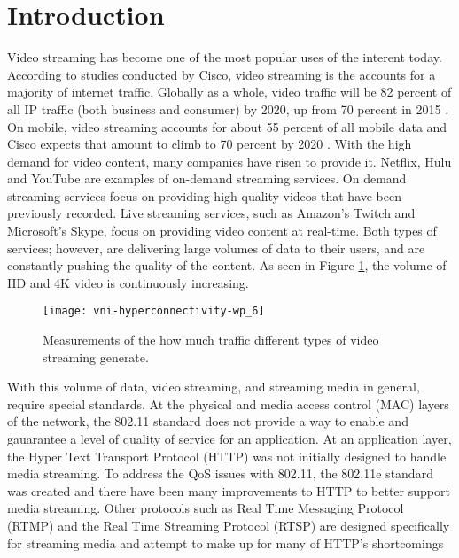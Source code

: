 \documentclass[12pt]{article}
\begin{document}
\section{Introduction}
Video streaming has become one of the most popular uses of the interent today.  According to studies conducted by Cisco, video streaming is the accounts for a majority of internet traffic.  Globally as a whole, video traffic will be 82 percent of all IP traffic (both business and consumer) by 2020, up from 70 percent in 2015 \cite{ciscozetabyte}.  On mobile, video streaming accounts for about 55 percent of all mobile data and Cisco expects that amount to climb to 70 percent by 2020 \cite{cisconetworkindex}.  With the high demand for video content, many companies have risen to provide it.  Netflix, Hulu and YouTube are examples of on-demand streaming services.  On demand streaming services focus on providing high quality videos that have been previously recorded.  Live streaming services, such as Amazon's Twitch and Microsoft's Skype, focus on providing video content at real-time.  Both types of services; however, are delivering large volumes of data to their users, and are constantly pushing the quality of the content. As seen in Figure \ref{fig:videostreamingdist}, the volume of HD and 4K video is continuously increasing.

\begin{figure}[htb]
  \begin{center}
    \texttt{[image: vni-hyperconnectivity-wp\_6]}
    \caption{Measurements of the how much traffic different types of video streaming generate.}
    \label{fig:videostreamingdist}
  \end{center}
\end{figure}

With this volume of data, video streaming, and streaming media in general, require special standards.  At the physical and media access control (MAC) layers of the network, the 802.11 standard does not provide a way to enable and gauarantee a level of quality of service for an application. At an application layer, the Hyper Text Transport Protocol (HTTP) was not initially designed to handle media streaming.  To address the QoS issues with 802.11, the 802.11e standard was created and there have been many improvements to HTTP to better support media streaming.  Other protocols such as Real Time Messaging Protocol (RTMP) and the Real Time Streaming Protocol (RTSP) are designed specifically for streaming media and attempt to make up for many of HTTP's shortcomings
\end{document}
